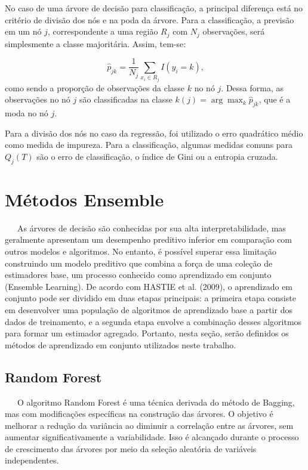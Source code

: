 \documentclass[
  12pt,
  a4paper,
]{scrreprt}
\begin{document}
\vspace{12pt}

No caso de uma árvore de decisão para classificação, a principal
diferença está no critério de divisão dos nós e na poda da árvore. Para
a classificação, a previsão em um nó \(j\), correspondente a uma região
\(R_j\) com \(N_j\) observações, será simplesmente a classe majoritária.
Assim, tem-se:

\[
\hat{p}_{jk} = \frac{1}{N_j}\sum_{x_i \in R_j} I\left(y_i = k\right)\text{,}
\] como sendo a proporção de observações da classe \(k\) no nó \(j\).
Dessa forma, as observações no nó \(j\) são classificadas na classe
\(k\left(j\right) = \arg \max_{k} \hat{p}_{jk}\), que é a moda no nó
\(j\).

\vspace{12pt}

Para a divisão dos nós no caso da regressão, foi utilizado o erro
quadrático médio como medida de impureza. Para a classificação, algumas
medidas comuns para \(Q_j\left(T\right)\) são o erro de classificação, o
índice de Gini ou a entropia cruzada.

\section{Métodos Ensemble}\label{muxe9todos-ensemble}

~~~As árvores de decisão são conhecidas por sua alta interpretabilidade,
mas geralmente apresentam um desempenho preditivo inferior em comparação
com outros modelos e algoritmos. No entanto, é possível superar essa
limitação construindo um modelo preditivo que combina a força de uma
coleção de estimadores base, um processo conhecido como aprendizado em
conjunto (Ensemble Learning). De acordo com HASTIE et al. (2009), o
aprendizado em conjunto pode ser dividido em duas etapas principais: a
primeira etapa consiste em desenvolver uma população de algoritmos de
aprendizado base a partir dos dados de treinamento, e a segunda etapa
envolve a combinação desses algoritmos para formar um estimador
agregado. Portanto, nesta seção, serão definidos os métodos de
aprendizado em conjunto utilizados neste trabalho.

\subsection{Random Forest}\label{random-forest}

~~~O algoritmo Random Forest é uma técnica derivada do método de
Bagging, mas com modificações específicas na construção das árvores. O
objetivo é melhorar a redução da variância ao diminuir a correlação
entre as árvores, sem aumentar significativamente a variabilidade. Isso
é alcançado durante o processo de crescimento das árvores por meio da
seleção aleatória de variáveis independentes.
\end{document}
